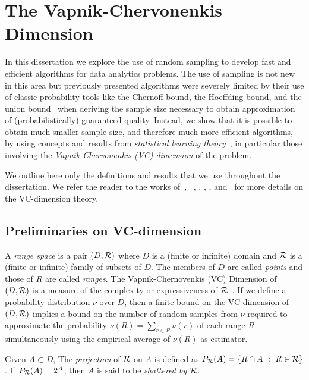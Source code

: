 \chapter{The Vapnik-Chervonenkis Dimension}\label{ch:vcdim}
In this dissertation we explore the use of random sampling to develop fast and
efficient algorithms for data analytics problems. The use of sampling is not new
in this area but previously presented algorithms were severely limited by their
use of classic probability tools like the Chernoff bound, the Hoeffding bound,
and the union bound~\citep{MitzenmacherU05} when deriving the sample size
necessary to obtain approximation of (probabilistically) guaranteed quality.
Instead, we show that it is possible to obtain much smaller sample size, and
therefore much more efficient algorithms, by using concepts and results from
\emph{statistical learning theory}~\citep{Vapnik99,Vapnik98}, in particular
those involving the \emph{Vapnik-Chervonenkis (VC) dimension} of the problem.

We outline here only the definitions and results that we use throughout the
dissertation. We refer the reader to the works of~\citet[Sect.~14.4]{AlonS08},
~\citet[Sect.~3]{BoucheronBL05}, \citet[Chap.~4]{Chazelle00},
\citet[Sect.~12.4]{DevroyeGL96}, \citet[Chap.~3]{MohriRT12},
and~\citet{Vapnik99,Vapnik98} for more details on the VC-dimension theory. 

\section{Preliminaries on VC-dimension}
A {\em range space} is a pair $(D,\mathcal{R})$ where $D$ is a (finite or infinite)
domain and $\mathcal{R}$ is a (finite or infinite) family of subsets of $D$. The
members of $D$ are called {\em points} and those of $R$ are called {\em ranges}.
The Vapnik-Chernovenkis (VC) Dimension of $(D,\mathcal{R})$  is a measure of the
complexity or expressiveness of $\mathcal{R}$~\citep{VapnikC71}. If we define a
probability distribution $\nu$ over $D$, then a finite bound on the
VC-dimension of $(D,\mathcal{R})$ implies a bound on the number of random samples
from $\nu$ required to approximate the probability $\nu(R)=\sum_{r\in R}\nu(r)$
of each range $R$ simultaneously using the empirical average of $\nu(R)$ as
estimator. 

Given $A\subset D$, The {\em projection} of $\mathcal{R}$ on $A$ is defined as
$P_{\mathcal{R}}(A)=\{R\cap A ~:~ R\in\mathcal{R}\}$. If $P_{\mathcal{R}}(A)=2^A$, then $A$ is said
to be {\em shattered by $\mathcal{R}$}. 

